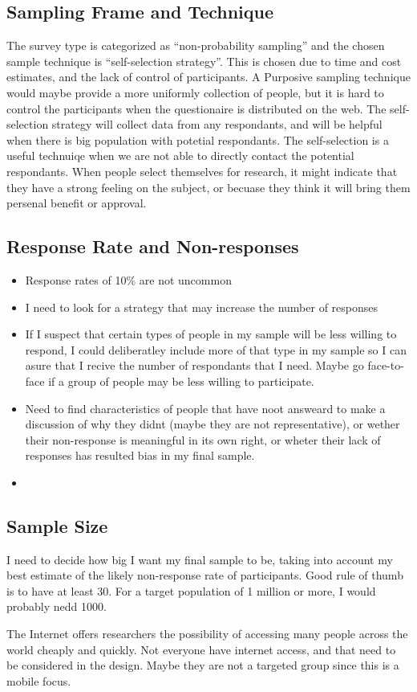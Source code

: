   \subsection{Sampling Frame and Technique}

    
    The survey type is categorized as ``non-probability sampling'' and the chosen sample technique is ``self-selection strategy''. This is chosen due to time and cost estimates, and the lack of control of participants. A Purposive sampling technique would maybe provide a more uniformly collection of people, but it is hard to control the participants when the questionaire is distributed on the web. The self-selection strategy will collect data from any respondants, and will be helpful when there is big population with potetial respondants. The self-selection is a useful technuiqe when we are not able to directly contact the potential respondants. When people select themselves for research, it might indicate that they have a strong feeling on the subject, or becuase they think it will bring them persenal benefit or approval. 

  \subsection{Response Rate and Non-responses}
    \begin{itemize}
      \item Response rates of 10\% are not uncommon
      \item I need to look for a strategy that may increase the number of responses
      \item If I suspect that certain types of people in my sample will be less willing to respond, I could deliberatley include more of that type in my sample so I can asure that I recive the number of respondants that I need. Maybe go face-to-face if a group of people may be less willing to participate. 
      \item Need to find characteristics of people that have noot answeard to make a discussion of why they didnt (maybe they are not representative), or wether their non-response is meaningful in its own right, or wheter their lack of responses has resulted bias in my final sample.
      \item 
      \end{itemize}

  \subsection{Sample Size}
    I need to decide how big I want my final sample to be, taking into account my best estimate of the likely non-response rate of participants. 
    Good rule of thumb is to have at least 30. For a target population of 1 million or more, I would probably nedd 1000. 

    The Internet offers researchers the possibility of accessing many people across the world cheaply and quickly. Not everyone have internet access, and that need to be considered in the design. Maybe they are not a targeted group since this is a mobile focus.

